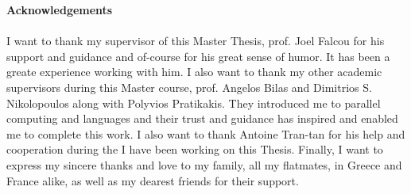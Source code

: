\thispagestyle{empty}
\begin{titlepage}
{\bf\Large Acknowledgements}\\
\paragraph{}
I want to thank my supervisor of this Master Thesis, prof. Joel Falcou for his support and guidance and of-course
for his great sense of humor. It has been a greate experience working with him. I also want to thank my 
other academic supervisors during this Master course, prof. Angelos Bilas and Dimitrios S. Nikolopoulos along with 
Polyvios Pratikakis. They introduced me to parallel computing and languages and their trust and guidance has
inspired and enabled me to complete this work. I also want to thank Antoine Tran-tan for his help and cooperation during the
I have been working on this Thesis. Finally, I want to express my sincere thanks and love to my family, all my
flatmates, in Greece and France alike, as well as my dearest friends for their support. 

\vfill
\end{titlepage}

